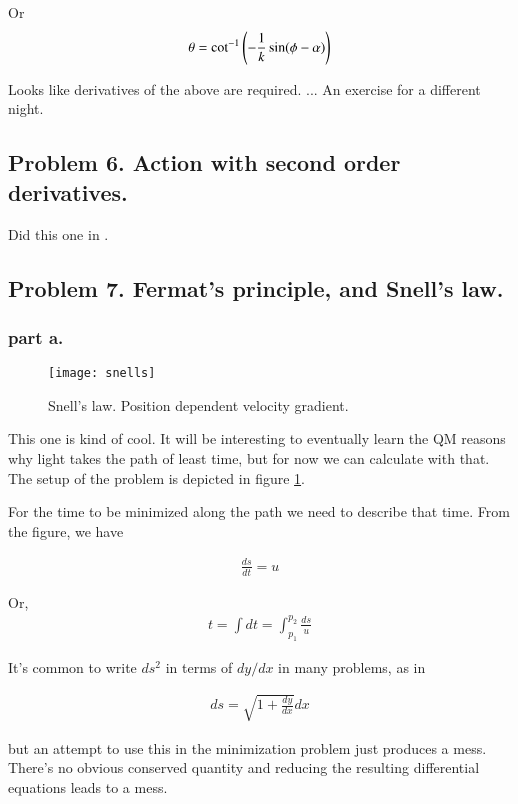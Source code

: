 Or
\begin{align*}
\theta = \cot^{-1}\left(-\frac{1}{k} \sin(\phi - \alpha)\right)
\end{align*}

Looks like derivatives of the above are required. ... An exercise for a different night.

\subsection{Problem 6.  Action with second order derivatives. }

Did this one in \citep{PJgoldch1}.

\subsection{Problem 7.  Fermat's principle, and Snell's law. }

\subsubsection{part a. }

\begin{figure}[htp]
\centering
\texttt{[image: snells]}
\caption{Snell's law.  Position dependent velocity gradient.}\label{fig:snells}
\end{figure}

This one is kind of cool.  It will be interesting to eventually learn the QM reasons why light takes the path of least time, but for now we can calculate with that.  The setup of the problem is depicted in figure \ref{fig:snells}.

For the time to be minimized along the path we need to describe that time.  From the figure, we have

\begin{align*}
\frac{ds}{dt} = u
\end{align*}

Or, 
\begin{align*}
t = \int dt = \int_{p_1}^{p_2} \frac{ds}{u}
\end{align*}

It's common to write $ds^2$ in terms of $dy/dx$ in many problems, as in 

\begin{align*}
ds = \sqrt{1 + \frac{dy}{dx}} dx
\end{align*}

but an attempt to use this in the minimization problem just produces a mess.   There's no obvious conserved quantity and reducing the resulting differential equations
leads to a mess.

